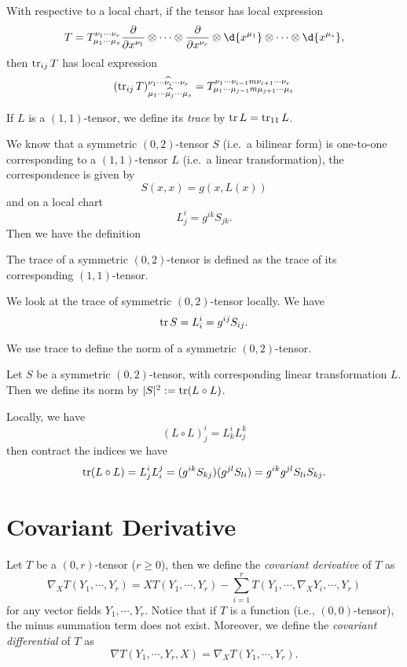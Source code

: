 With respective to a local chart, if the tensor has local expression
\[T=T_{\mu_1\cdots\mu_s}^{\nu_1\cdots\nu_r}\frac{\partial{}}{\partial{x^{\nu_1}}}\otimes\cdots\otimes\frac{\partial{}}{\partial{x^{\nu_r}}}\otimes\d{x^{\mu_1}}\otimes\cdots\otimes\d{x^{\mu_s}},\]
then $\operatorname{tr}_{ij}T$ has local expression
\[(\operatorname{tr}_{ij}T)_{\mu_1\cdots\widehat{\mu_{j}}\cdots\mu_s}^{\nu_1\cdots\widehat{\nu_{i}}\cdots\nu_r}=T_{\mu_1\cdots\mu_{j-1}m\mu_{j+1}\cdots\mu_s}^{\nu_1\cdots\nu_{i-1}m\nu_{i+1}\cdots\nu_r}\]

\begin{defn}
    If $L$ is a $(1,1)$-tensor, we define its \emph{trace} by $\operatorname{tr}{L}=\operatorname{tr}_{11}L$.
\end{defn}

We know that a symmetric $(0,2)$-tensor $S$ (i.e.\ a bilinear form) is one-to-one corresponding to a $(1,1)$-tensor $L$ (i.e.\ a linear transformation), the correspondence is given by
\[S(x,x)=g(x,L(x))\]
and on a local chart
\[L^i_j=g^{ik}S_{jk}.\]
Then we have the definition

\begin{defn}
    The trace of a symmetric $(0,2)$-tensor is defined as the trace of its corresponding $(1,1)$-tensor.
\end{defn}

We look at the trace of symmetric $(0,2)$-tensor locally.
We have
\[\operatorname{tr}{S}=L^i_i=g^{ij}S_{ij}.\]

We use trace to define the norm of a symmetric $(0,2)$-tensor.
\begin{defn}
    Let $S$ be a symmetric $(0,2)$-tensor, with corresponding linear transformation $L$.
    Then we define its norm by $|S|^2:=\operatorname{tr}(L\circ L)$.
\end{defn}

Locally, we have
\[(L\circ L)^i_j=L^i_kL^k_j\]
then contract the indices we have
\[\operatorname{tr}(L\circ L)=L^i_jL^j_i=(g^{ik}S_{kj})(g^{jl}S_{li})=g^{ik}g^{jl}S_{li}S_{kj}.\]

\section{Covariant Derivative}

\begin{defn}
    Let $T$ be a $(0,r)$-tensor ($r\geq 0$), then we define the \emph{covariant derivative} of $T$ as
    \[\nabla_XT(Y_1,\cdots,Y_r)=XT(Y_1,\cdots,Y_r)-\sum_{i=1}^rT(Y_1,\cdots,\nabla_XY_i,\cdots,Y_r)\]
    for any vector fields $Y_1,\cdots,Y_r$.
    Notice that if $T$ is a function (i.e., $(0,0)$-tensor), the minus summation term does not exist.
    Moreover, we define the \emph{covariant differential} of $T$ as
    \[\nabla T(Y_1,\cdots,Y_r,X)=\nabla_XT(Y_1,\cdots,Y_r).\]
\end{defn}

